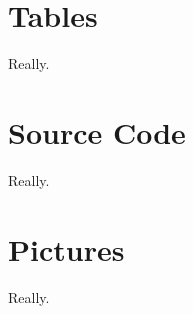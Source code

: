 \begin{appendices}
\renewcommand{\thesection}{\appendixname~\Alph{section}}
\section{Tables}
Really.
\section{Source Code}
Really.
\section{Pictures}
Really.
\end{appendices}
